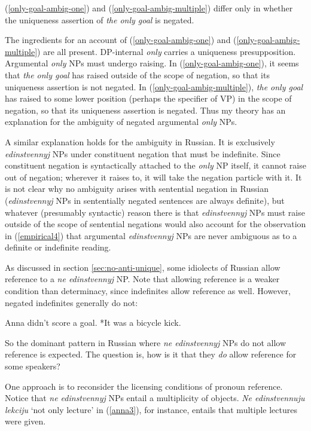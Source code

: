 (\ref{only-goal-ambig-one}) and (\ref{only-goal-ambig-multiple}) differ only in whether the uniqueness assertion of \textit{the only goal} is negated.

The ingredients for an account of (\ref{only-goal-ambig-one}) and (\ref{only-goal-ambig-multiple}) are all present. DP-internal \textit{only} carries a uniqueness presupposition. Argumental \textit{only} NPs must undergo raising. In (\ref{only-goal-ambig-one}), it seems that \textit{the only goal} has raised outside of the scope of negation, so that its uniqueness assertion is not negated. In (\ref{only-goal-ambig-multiple}), \textit{the only goal} has raised to some lower position (perhaps the specifier of VP) in the scope of negation, so that its uniqueness assertion is negated. Thus my theory has an explanation for the ambiguity of negated argumental \textit{only} NPs.

A similar explanation holds for the ambiguity in Russian. It is exclusively \textit{edinstvennyj} NPs under constituent negation that must be indefinite. Since constituent negation is syntactically attached to the \textit{only} NP itself, it cannot raise out of negation; wherever it raises to, it will take the negation particle with it. It is not clear why no ambiguity arises with sentential negation in Russian (\textit{edinstvennyj} NPs in sententially negated sentences are always definite), but whatever (presumably syntactic) reason there is that \textit{edinstvennyj} NPs must raise outside of the scope of sentential negations would also account for the observation in (\ref{empirical4}) that argumental \textit{edinstvennyj} NPs are never ambiguous as to a definite or indefinite reading.

As discussed in section \ref{sec:no-anti-unique}, some idiolects of Russian allow reference to a \textit{ne edinstvennyj} NP. Note that allowing reference is a weaker condition than determinacy, since indefinites allow reference as well. However, negated indefinites generally do not:

\begin{exe}
	\ex Anna didn't score a goal. *It was a bicycle kick.
\end{exe}

So the dominant pattern in Russian where \textit{ne edinstvennyj} NPs do not allow reference is expected. The question is, how is it that they \textit{do} allow reference for some speakers?

One approach is to reconsider the licensing conditions of pronoun reference. Notice that \textit{ne edinstvennyj} NPs entail a multiplicity of objects. \textit{Ne edinstvennuju lekciju} `not only lecture' in (\ref{anna3}), for instance, entails that multiple lectures were given.

